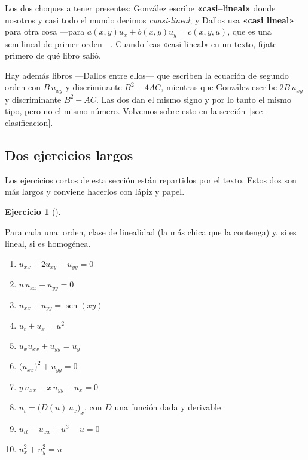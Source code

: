\documentclass[
  spanish,
  a4paper,
]{scrbook}
\providecommand{\tightlist}{%
  \setlength{\itemsep}{0pt}\setlength{\parskip}{0pt}}
\theoremstyle{definition}
\theoremstyle{plain}
\theoremstyle{definition}
\theoremstyle{plain}
\theoremstyle{definition}
\newtheorem{exercise}{Ejercicio}[chapter]
\theoremstyle{remark}
\begin{document}
\begin{tcolorbox}[enhanced jigsaw, arc=.35mm, bottomrule=.15mm, breakable, colback=white, colframe=quarto-callout-warning-color-frame, left=2mm, leftrule=.75mm, opacityback=0, rightrule=.15mm, toprule=.15mm]
\begin{minipage}[t]{\textwidth - 5.5mm}
Los dos choques a tener presentes: González escribe
\textbf{«casi--lineal»} donde nosotros y casi todo el mundo decimos
\emph{cuasi-lineal}; y Dallos usa \textbf{«casi lineal»} para otra cosa
---para \(a(x,y)u_x + b(x,y)u_y = c(x,y,u)\), que es una semilineal de
primer orden---. Cuando leas «casi lineal» en un texto, fijate primero
de qué libro salió.

Hay además libros ---Dallos entre ellos--- que escriben la ecuación de
segundo orden con \(B\,u_{xy}\) y discriminante \(B^2-4AC\), mientras
que González escribe \(2B\,u_{xy}\) y discriminante \(B^2-AC\). Las dos
dan el mismo signo y por lo tanto el mismo tipo, pero no el mismo
número. Volvemos sobre esto en la sección~\ref{sec-clasificacion}.

\end{minipage}%
\end{tcolorbox}

\subsection*{Dos ejercicios largos}\label{dos-ejercicios-largos}

Los ejercicios cortos de esta sección están repartidos por el texto.
Estos dos son más largos y conviene hacerlos con lápiz y papel.

\begin{exercise}[]\protect\hypertarget{exr-clasificar-linealidad}{}\label{exr-clasificar-linealidad}

Para cada una: orden, clase de linealidad (la más chica que la contenga)
y, si es lineal, si es homogénea.

\begin{enumerate}
\def\labelenumi{\alph{enumi}.}
\tightlist
\item
  \(u_{xx} + 2u_{xy} + u_{yy} = 0\)
\item
  \(u\,u_{xx} + u_{yy} = 0\)
\item
  \(u_{xx} + u_{yy} = \operatorname{sen}(xy)\)
\item
  \(u_t + u_x = u^2\)
\item
  \(u_x u_{xx} + u_{yy} = u_y\)
\item
  \(\big(u_{xx}\big)^2 + u_{yy} = 0\)
\item
  \(y\,u_{xx} - x\,u_{yy} + u_x = 0\)
\item
  \(u_t = \big(D(u)\,u_x\big)_x\), con \(D\) una función dada y
  derivable
\item
  \(u_{tt} - u_{xx} + u^3 - u = 0\)
\item
  \(u_x^2 + u_y^2 = u\)
\end{enumerate}

\end{exercise}
\end{document}
